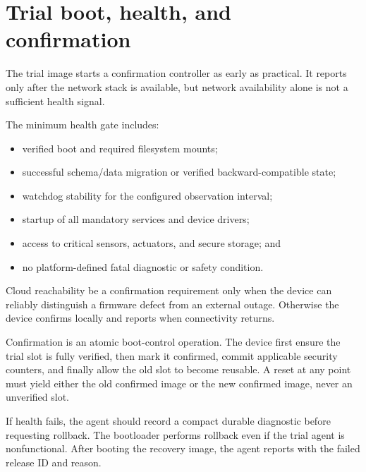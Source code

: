 \section{Trial boot, health, and confirmation}

The trial image starts a confirmation controller as early as practical. It
reports  only after the network stack is available, but
network availability alone is not a sufficient health signal.

The minimum health gate includes:

\begin{itemize}
  \item verified boot and required filesystem mounts;
  \item successful schema/data migration or verified backward-compatible state;
  \item watchdog stability for the configured observation interval;
  \item startup of all mandatory services and device drivers;
  \item access to critical sensors, actuators, and secure storage; and
  \item no platform-defined fatal diagnostic or safety condition.
\end{itemize}

Cloud reachability \should be a confirmation requirement only when the device can
reliably distinguish a firmware defect from an external outage. Otherwise the
device confirms locally and reports when connectivity returns.

Confirmation is an atomic boot-control operation. The device \must first ensure
the trial slot is fully verified, then mark it confirmed, commit applicable
security counters, and finally allow the old slot to become reusable. A reset at
any point must yield either the old confirmed image or the new confirmed image,
never an unverified slot.

If health fails, the agent should record a compact durable diagnostic before
requesting rollback. The bootloader performs rollback even if the trial agent is
nonfunctional. After booting the recovery image, the agent reports
 with the failed release ID and reason.

